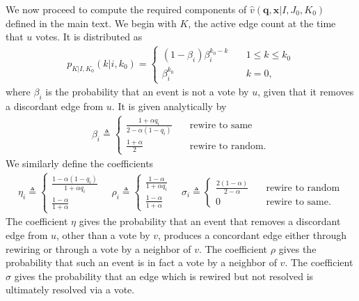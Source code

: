 \documentclass[final,supplement,onefignum,onetabnum]{siamart171218}
\begin{document}
  We now proceed to compute the required components of $\hat{v}(\mathbf{q}, \mathbf{x}|I, J_0, K_0)$ defined in the main text. 
  We begin with $K$, the active edge count at the time that $u$ votes. 
  It is distributed as 
  \begin{align*}
    p_{K|I, K_0}(k|i, k_0) = 
    \begin{cases}
      (1-\beta_i)\beta_i^{k_0 - k} &\quad 1\leq k \leq k_0\\ 
      \beta_i^{k_0} &\quad k = 0,
    \end{cases}
  \end{align*}
  where $\beta_i$ is the probability that an event is not a vote by $u$, given that it removes a discordant edge from $u$. 
  It is given analytically by 
  \begin{align*}
    \beta_i \triangleq 
    \begin{cases}
      \frac{1+\alpha q_i}{2-\alpha(1-q_i)} &\quad \text{rewire to same}\\ 
      \frac{1+\alpha}{2} &\quad \text{rewire to random.}
    \end{cases}
  \end{align*}
  We similarly define the coefficients 
 \begin{align*}
    \eta_i \triangleq 
    \begin{cases}
      \frac{1-\alpha(1-q_i)}{1+\alpha q_i}  \\ 
      \frac{1-\alpha}{1+\alpha} 
    \end{cases} \quad 
    \rho_i \triangleq 
    \begin{cases}
      \frac{1-\alpha}{1+\alpha q_i}  \\ 
      \frac{1-\alpha}{1+\alpha}   
    \end{cases} \quad 
    \sigma_i \triangleq 
    \begin{cases}
      \frac{2(1-\alpha)}{2-\alpha} &\quad \text{rewire to random} \\ 
      0   &\quad \text{rewire to same.}
    \end{cases}
  \end{align*}
  The coefficient $\eta$ gives the probability that an event that removes a discordant edge from $u$, other than a vote by $v$, produces a concordant edge either through rewiring or through a vote by a neighbor of $v$. The coefficient $\rho$ gives the probability that such an event is in fact a vote by a neighbor of $v$. The coefficient $\sigma$ gives the probability that an edge which is rewired but not resolved is ultimately resolved via a vote. 
\end{document}
